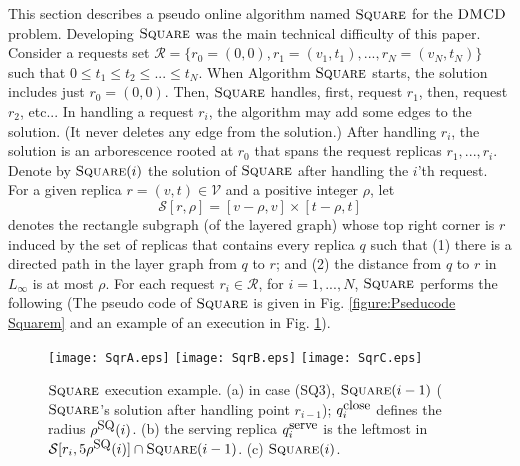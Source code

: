 \documentclass[11pt]{article}
\newcommand{\DMCD}{\mbox{\sc DMCD}}
\newcommand{\calV}{\mathcal{V}}
\newcommand{\calR}{\mathcal{R}}
\newcommand{\calS}{\mathcal{S}}
\newcommand{\Square}[0]{\mbox{\sc Square}}
\newcommand{\rr}{r}
\newcommand{\NN}{N}
\newcommand{\qSQ}{q^{\mbox{\small\upshape serve}}}
\newcommand{\qclose}{q^{\mbox{\small\upshape close}}}
\newcommand{\rhoSQ}[0]{\rho^{\mbox{\small\upshape SQ}}}
\newcommand{\seq}[1]{\calS[#1]}
\begin{document}
This section describes a pseudo online algorithm named $\Square$ for the $\DMCD$ problem.
Developing $\Square$ was the main technical difficulty of this paper.
Consider a requests set $\calR=\{\rr_0=(0,0),\rr_1=(v_1,t_1),...,\rr_\NN=(v_\NN,t_\NN) \}$ such that $0\leq t_1\leq t_2\leq...\leq t_\NN$.
When Algorithm $\Square$ starts, the solution includes just $\rr_0=(0,0)$.
Then, $\Square$ handles, first, request $\rr_1$, then, request $\rr_2$, etc...
In handling a request $\rr_i$, the algorithm
may add some edges to the solution.
(It never deletes any edge from the solution.)
After handling $\rr_i$, the solution is an arborescence rooted at $\rr_0$ that spans the request replicas $\rr_1,...,\rr_i$.
Denote by $\Square(i)$ the solution of $\Square$ after handling the $i$'th request.
For a given replica $\rr=(v,t)\in \calV$ and a positive integer $\rho$,
let
\vspace{-0.1cm}
$$
\seq{r,\rho}=[v-\rho, v]\times [t-\rho, t]
$$
denotes the rectangle subgraph (of the layered graph) whose top right corner is $r$ induced by the set of replicas
that contains every replica $q$ such that
(1) there is a directed path in the layer graph from $q$ to $r$; and
(2) the distance from $q$ to $r$ in $L_\infty$ is at most $\rho$.
For each request $\rr_i\in\calR$, for $i=1,...,\NN$, $\Square$ performs the following
(The pseudo code of $\Square$ is given in Fig. \ref{figure:Pseducode Squarem}
and an example of an execution in Fig. \ref{fig: Square execution SQ3}).



\begin{figure}[htb]
\begin{center}
\texttt{[image: SqrA.eps]}
\hfill
\texttt{[image: SqrB.eps]}
\hfill
\texttt{[image: SqrC.eps]}
\end{center}
\caption{\sf $\Square$ execution example.
(a) in case (SQ3), $\Square(i-1)$ ($\Square$'s solution after handling point $r_{i-1}$); $\qclose_i$ defines the radius $\rhoSQ(i)$.
(b) the serving replica $\qSQ_i$ is the leftmost in $\seq{r_i,5\rhoSQ(i)}\cap\Square(i-1)$.
(c) $\Square(i)$.
\label{fig: Square execution SQ3}
}
\end{figure}
\end{document}
